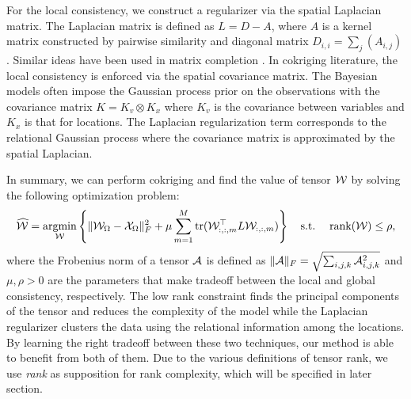 For the local consistency, we construct a regularizer via the spatial Laplacian matrix. The Laplacian matrix is defined as  $L = D-A$, where $A$ is a kernel matrix constructed by pairwise similarity %
and diagonal matrix $D_{i,i}= \sum_{j} (A_{i,j})$. %
Similar ideas have been used in matrix completion \cite{li2009relation}. In cokriging literature, the local consistency is enforced via the spatial covariance matrix. The Bayesian models often impose the Gaussian process prior on the observations with the covariance matrix $K = K_v \otimes K_x $ where $K_v$ is the covariance between variables and $K_x$ is that for locations. The Laplacian regularization term corresponds to the relational Gaussian process \cite{chu2006relational} where the covariance matrix is approximated by the spatial Laplacian.


In summary, we can perform cokriging and find the value of tensor ${\mathcal W}$ by solving the following optimization problem:
\begin{align}
\widehat{{\mathcal W}} =\operatorname*{argmin}_{{\mathcal W}}& \left\{ \|{\mathcal W}_\Omega - {\mathcal X}_\Omega \|^2_F +  \mu \sum\limits_{m=1}^M \text{tr} ({\mathcal W}_{:,:,m}^\top L {\mathcal W}_{:,:,m}) \right\} \quad
\mathrm{s.t.} \;&  \text{rank}({\mathcal W}) \leq \rho,  \label{eqn:cokriging}
\end{align}
\noindent  where the Frobenius norm of a tensor ${\mathcal A}$ is defined as $\|{\mathcal A}\|_F = \sqrt{\sum_{i, j, k}{\mathcal A}_{i, j, k}^2}$ and $\mu, \rho > 0$ are the parameters that make  tradeoff between the local and global consistency, respectively.  The low rank constraint finds the principal components of the tensor and reduces the complexity of the model while the Laplacian regularizer clusters the data using the relational information among the locations.  By learning the right tradeoff between these two techniques, our method is able to benefit from both of them. Due to the various definitions of tensor rank, we use \textit{rank} as supposition for rank complexity, which will be specified in later section.
